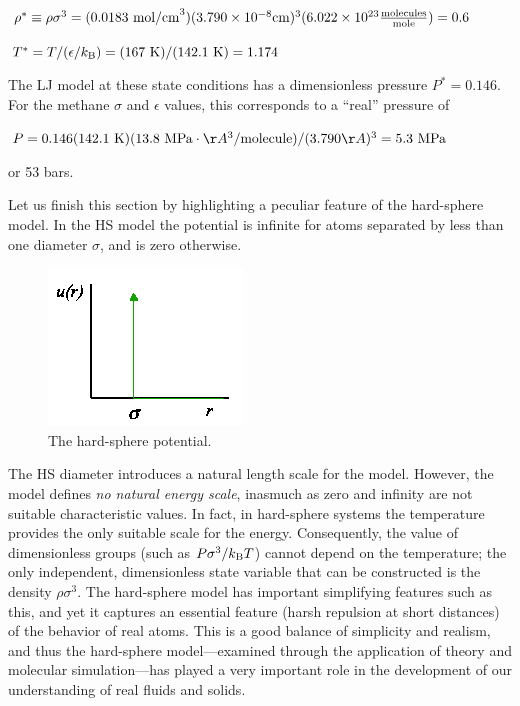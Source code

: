 \documentclass[]{article}
\begin{document}
$\rho^* \equiv \rho\sigma^3 = (0.0183~{\rm mol/cm}^3)(3.790 \times
10^{-8} {\rm cm})^3(6.022 \times 10^{23} \frac{{\rm molecules}}{{\rm mole}}) = 0.6$

$T^* = T/(\epsilon/k_{\rm B}) = (167~{\rm K})/(142.1~{\rm K}) = 1.174$

The LJ model at these state conditions has a dimensionless pressure $P^* =
0.146$. For the methane $\sigma$ and $\epsilon$ values, this corresponds to a ``real''
pressure of

$P = 0.146 (142.1~{\rm K})(13.8~{\rm MPa}\cdot\AA^{3}/{\rm molecule})/(3.790\AA)^{3} = 5.3~{\rm MPa}$

or 53 bars.

Let us finish this section by highlighting a peculiar feature of the
hard-sphere model. In the HS model the potential is infinite for atoms
separated by less than one diameter $\sigma$, and is zero otherwise.

\begin{figure}
  \centering
  \includegraphics[width=5 cm]{SimElements_figures/image001}
  \caption{\label{fig:HS} The hard-sphere potential.}
\end{figure}

The HS diameter introduces a natural length scale for the model.
However, the model defines \emph{no natural energy scale}, inasmuch as
zero and infinity are not suitable characteristic values. In fact, in
hard-sphere systems the temperature provides the only suitable scale for
the energy. Consequently, the value of dimensionless groups (such as
$P\sigma^3/k_{\rm B}T$) cannot depend on the temperature; the only
independent, dimensionless state variable that can be constructed is the
density $\rho\sigma^3$. The hard-sphere model has important
simplifying features such as this, and yet it captures an essential
feature (harsh repulsion at short distances) of the behavior of real
atoms. This is a good balance of simplicity and realism, and thus the
hard-sphere model---examined through the application of theory and
molecular simulation---has played a very important role in the
development of our understanding of real fluids and solids.
\end{document}

